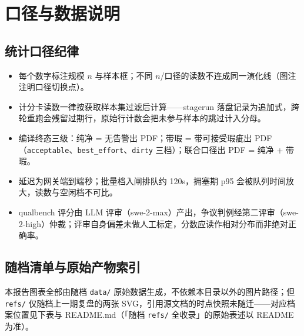 \appendix
\section{口径与数据说明}

\subsection{统计口径纪律}

\begin{itemize}
  \item 每个数字标注规模 $n$ 与样本框；不同 $n$/口径的读数不连成同一演化线（图注注明口径切换点）。
  \item 计分卡读数一律按获取样本集过滤后计算——stagerun 落盘记录为追加式，跨轮重跑会残留过期行，原始行计数会把未参与样本的跳过计入分母。
  \item 编译终态三级：纯净 = 无告警出 PDF；带瑕 = 带可接受瑕疵出 PDF（\texttt{acceptable}、\texttt{best\_effort}、\texttt{dirty} 三档）；联合口径出 PDF = 纯净 + 带瑕。
  \item 延迟为网关端到端秒；批量档入闸排队约 120s，拥塞期 p95 会被队列时间放大，读数与空闲档不可比。
  \item qualbench 评分由 LLM 评审（swe-2-max）产出，争议判例经第二评审（swe-2-high）仲裁；评审自身偏差未做人工标定，分数应读作相对分布而非绝对正确率。
\end{itemize}

\subsection{随档清单与原始产物索引}

本报告图表全部由随档 \texttt{data/} 原始数据生成，不依赖本目录以外的图片路径；但 \texttt{refs/} 仅随档上一期复盘的两张 SVG，引用源文档的时点快照未随迁——对应档案位置见下表与 README.md（「随档 \texttt{refs/} 全收录」的原始表述以 README 为准）。

